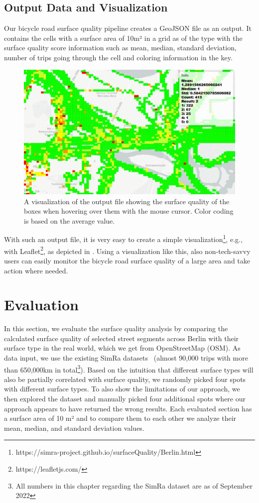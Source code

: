 \subsection{Output Data and Visualization}
\label{subsec:output_data_and_visualization}
Our bicycle road surface quality pipeline creates a GeoJSON file as an output.
It contains the cells with a surface area of 10m² in a grid as  of the  type  with the surface quality score information such as mean, median, standard deviation, number of trips going through the cell and coloring information in the  key.
 \begin{figure}
    \centering
    \includegraphics[width=0.7\columnwidth]{fig/visualization.png}
    \caption{%
A visualization of the output file showing the surface quality of the boxes when hovering over them with the mouse cursor. Color coding is based on the average value.}%
    \label{fig:visualization}
\end{figure}
With such an output file, it is very easy to create a simple visualization\footnote{https://simra-project.github.io/surfaceQuality/Berlin.html}, e.g., with Leaflet\footnote{https://leafletjs.com/}, as depicted in .
Using a visualization like this, also non-tech-savvy users can easily monitor the bicycle road surface quality of a large area and take action where needed.


\section{Evaluation}
\label{sec:evaluation_cyclequality}
In this section, we evaluate the surface quality analysis by comparing the calculated surface quality of selected street segments across Berlin with their surface type in the real world, which we get from OpenStreetMap (OSM).
As data input, we use the existing SimRa datasets~\cite{dataset_simra_set1,dataset_simra_set2,dataset_simra_set3} (almost 90,000 trips with more than 650,000km in total\footnote{All numbers in this chapter regarding the SimRa dataset are as of September 2022}).
Based on the intuition that different surface types will also be partially correlated with surface quality, we randomly picked four spots with different surface types.
To also show the limitations of our approach, we then explored the dataset and manually picked four additional spots where our approach appears to have returned the wrong results.
Each evaluated section has a surface area of 10 m² and to compare them to each other we analyze their mean, median, and standard deviation values.

